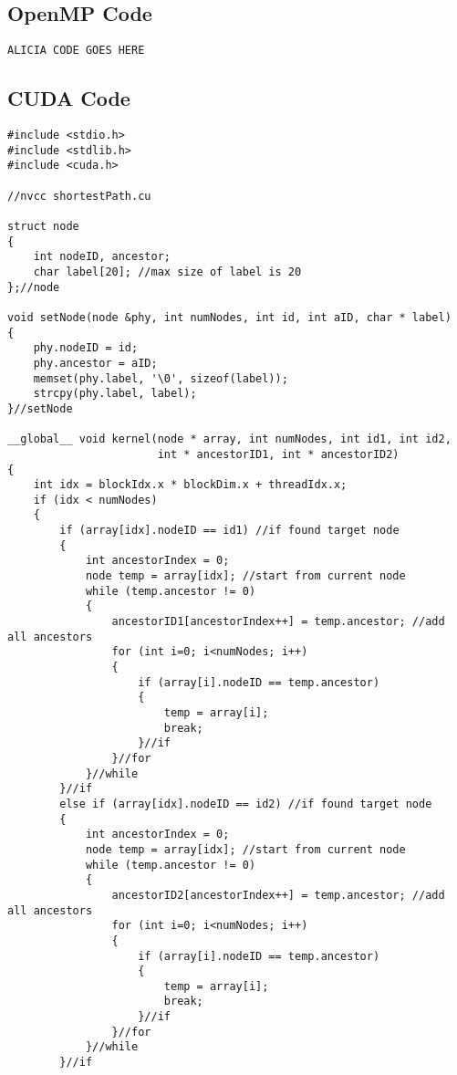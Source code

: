 \documentclass[11pt,letterpaper]{article}
\begin{document}
\subsection{OpenMP Code}
\begin{lstlisting}[style=MyC++Style]
ALICIA CODE GOES HERE
\end{lstlisting}

\subsection{CUDA Code}
\begin{lstlisting}[style=MyC++Style]
#include <stdio.h>
#include <stdlib.h>
#include <cuda.h>

//nvcc shortestPath.cu

struct node
{
    int nodeID, ancestor;
    char label[20]; //max size of label is 20
};//node

void setNode(node &phy, int numNodes, int id, int aID, char * label)
{
    phy.nodeID = id;
    phy.ancestor = aID;
    memset(phy.label, '\0', sizeof(label));
    strcpy(phy.label, label);
}//setNode

__global__ void kernel(node * array, int numNodes, int id1, int id2,
                       int * ancestorID1, int * ancestorID2)
{
    int idx = blockIdx.x * blockDim.x + threadIdx.x;
    if (idx < numNodes)
    {
        if (array[idx].nodeID == id1) //if found target node
        {
            int ancestorIndex = 0;
            node temp = array[idx]; //start from current node
            while (temp.ancestor != 0)
            {
                ancestorID1[ancestorIndex++] = temp.ancestor; //add all ancestors
                for (int i=0; i<numNodes; i++)
                {
                    if (array[i].nodeID == temp.ancestor)
                    {
                        temp = array[i];
                        break;
                    }//if
                }//for
            }//while
        }//if   
        else if (array[idx].nodeID == id2) //if found target node
        {
            int ancestorIndex = 0;
            node temp = array[idx]; //start from current node
            while (temp.ancestor != 0)
            {
                ancestorID2[ancestorIndex++] = temp.ancestor; //add all ancestors
                for (int i=0; i<numNodes; i++)
                {
                    if (array[i].nodeID == temp.ancestor)
                    {
                        temp = array[i];
                        break;
                    }//if
                }//for
            }//while
        }//if


\end{lstlisting}
\end{document}
